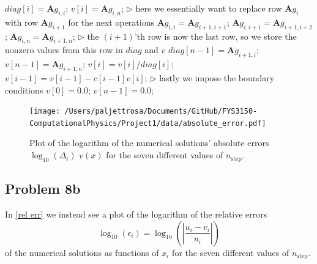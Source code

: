 \documentclass[english,notitlepage]{revtex4-1}  %
\begin{document}
\begin{algorithm}[H]
\begin{algorithmic}
        \State $diag[i] = \textbf{A}g_{i,i}$; 
        \State $v[i] = \textbf{A}g_{i,n}$; 
        \State
        \State $\triangleright$ here we essentially want to replace row $\textbf{A}g_{i}$ with row $\textbf{A}g_{i+1}$ for the next operations
        \State $\textbf{A}g_{i,i} = \textbf{A}g_{i+1,i+1}$; 
        \State $\textbf{A}g_{i,i+1} = \textbf{A}g_{i+1,i+2}$; 
        \State $\textbf{A}g_{i,n} = \textbf{A}g_{i+1,n}$; 
        \EndFor
        \State
        \State $\triangleright$ the $(i+1)$'th row is now the last row, so we store the nonzero values from this row in $diag$ and $v$
        \State $diag[n-1] = \textbf{A}g_{i+1,i}$;  
        \State $v[n-1] = \textbf{A}g_{i+1,n}$; 
        \State
         
        \State $v[i] = v[i]/diag[i]$;  
        \State $v[i-1] = v[i-1] - c[i-1]v[i]$; 
        \EndFor
        \State
        \State $\triangleright$ lastly we impose the boundary conditions
        \State $v[0] = 0.0$;  
        \State $v[n-1] = 0.0$;  
        
    \end{algorithmic}
\end{algorithm}

\begin{figure}[h!]
    \centering 
    \texttt{[image: /Users/paljettrosa/Documents/GitHub/FYS3150-ComputationalPhysics/Project1/data/absolute\_error.pdf]} %
    \caption{Plot of the logarithm of the numerical solutions' absolute errors $\log_{10}(\Delta_i)$ $v(x)$ for the seven different values of $n_\text{step}$.}
    \label{abs err}
\end{figure}

\subsection*{Problem 8b}
In \cref{rel err} we instead see a plot of the logarithm of the relative errors 
\begin{equation}
    \log_{10}(\epsilon_i) = \log_{10}\left(\left|\frac{u_i - v_i}{u_i}\right|\right)
\end{equation}
of the numerical solutions as functions of $x_i$ for the seven different values of $n_\text{step}$.
\end{document}
